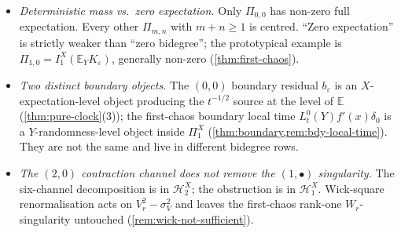 \documentclass[EJP]{ejpecp}
\renewcommand{\E}{\mathbb{E}}
\newcommand{\Hilb}{\mathcal{H}}
\newcommand{\Pir}{\Pi}
\begin{document}
\begin{itemize}
\item \emph{Deterministic mass vs.\ zero expectation.} Only
$\Pir_{0,0}$ has non-zero full expectation. Every other
$\Pir_{m,n}$ with $m+n\ge 1$ is centred. ``Zero expectation'' is
strictly weaker than ``zero bidegree''; the prototypical example is
$\Pir_{1,0}=I_1^X(\E_Y K_\varepsilon)$, generally non-zero
(\cref{thm:first-chaos}).
\item \emph{Two distinct boundary objects.} The $(0,0)$ boundary
residual $b_\varepsilon$ is an $X$-expectation-level object
producing the $t^{-1/2}$ source at the level of $\E$
(\cref{thm:pure-clock}(3)); the first-chaos boundary local time
$L_t^{0}(Y)f'(x)\delta_0$ is a $Y$-randomness-level object inside
$\Pir_1^X$ (\cref{thm:boundary,rem:bdy-local-time}). They are not
the same and live in different bidegree rows.
\item \emph{The $(2,0)$ contraction channel does not remove the
$(1,\bullet)$ singularity.} The six-channel decomposition is in
$\Hilb_2^X$; the obstruction is in $\Hilb_1^X$. Wick-square
renormalisation acts on $V_r^{2}-\sigma_V^{2}$ and leaves the
first-chaos rank-one $W_r$-singularity untouched
(\cref{rem:wick-not-sufficient}).
\end{itemize}
\end{document}
